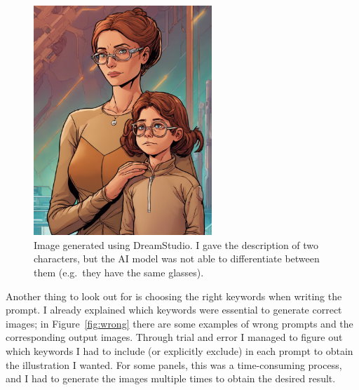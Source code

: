 \documentclass[a4paper,11pt]{article}
\begin{document}
\begin{figure}[htb]
    \centering
    \includegraphics[width=0.6\textwidth]{figures/no-distinguish-between-people.png}
    \caption{Image generated using DreamStudio. I gave the description of two characters, but the AI model was not able to differentiate between them (e.g.~they have the same glasses).}
    \label{fig:distinguish}
\end{figure}

Another thing to look out for is choosing the right keywords when writing the prompt. I already explained which keywords were essential to generate correct images; in Figure~\vref{fig:wrong} there are some examples of wrong prompts and the corresponding output images. Through trial and error I managed to figure out which keywords I had to include (or explicitly exclude) in each prompt to obtain the illustration I wanted. For some panels, this was a time-consuming process, and I had to generate the images multiple times to obtain the desired result.\medskip
\end{document}
